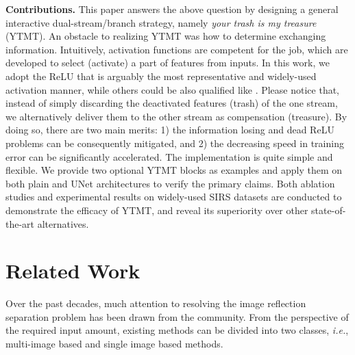 \documentclass{article}
\begin{document}
\textbf{Contributions.} This paper answers the above question by designing a general interactive dual-stream/branch strategy, namely \emph{your trash is my treasure} (YTMT). An obstacle to realizing YTMT was how to determine exchanging information. Intuitively, activation functions are competent for the job, which are developed to select (activate) a part of features from inputs. In this work, we adopt the ReLU that is arguably the most representative and widely-used activation manner, while others could be also qualified like \cite{DBLP:conf/nips/DugasBBNG00, maas2013rectifier, he2015delving, DBLP:journals/corr/ClevertUH15}. Please notice that, instead of simply discarding the deactivated features (trash) of the one stream, we alternatively deliver them to the other stream as compensation (treasure). By doing so, there are two main merits: 1) the information losing and dead ReLU problems can be consequently mitigated, and 2) the decreasing speed in training error can be significantly accelerated. The implementation is quite simple and flexible. We provide two optional YTMT blocks as examples and apply them on both plain and UNet architectures to verify the primary claims. Both ablation studies and experimental results on widely-used SIRS datasets are conducted to demonstrate the efficacy of YTMT, and reveal its superiority over other state-of-the-art alternatives. 


\section{Related Work}
\label{sec:RW}
Over the past decades, much attention to resolving the image reflection separation problem has been drawn from the community. From the perspective of the required input amount, existing methods can be divided into two classes, \emph{i.e.}, multi-image based and single image based methods. 
\end{document}
